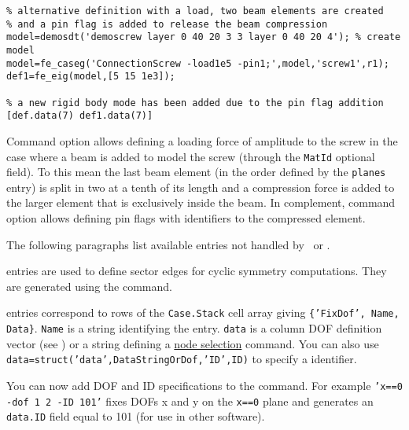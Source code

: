 \begin{SDT}
\begin{verbatim}
% alternative definition with a load, two beam elements are created
% and a pin flag is added to release the beam compression
model=demosdt('demoscrew layer 0 40 20 3 3 layer 0 40 20 4'); % create model
model=fe_caseg('ConnectionScrew -load1e5 -pin1;',model,'screw1',r1);
def1=fe_eig(model,[5 15 1e3]);

% a new rigid body mode has been added due to the pin flag addition
[def.data(7) def1.data(7)]
\end{verbatim}%

\vs

Command option  allows defining a loading force of amplitude  to the screw in the case where a beam is added to model the screw (through the {\tt MatId} optional field). To this mean the last beam element (in the order defined by the {\tt planes} entry) is split in two at a tenth of its length and a compression force is added to the larger element that is exclusively inside the beam. In complement, command option  allows defining pin flags with identifiers  to the compressed \beam element.


\end{SDT}


The following paragraphs list available entries not handled by \feload\ or \upcom.


\rz{} entries are used to define sector edges for cyclic symmetry computations. They are generated using the  command.


 entries correspond to rows of the {\tt Case.Stack} cell array giving {\tt \{'FixDof', Name, Data\}}. {\tt Name} is a string identifying the entry. {\tt data} is a column DOF definition vector (see ) or a string defining a \hyperlink{findnode}{node selection} command. You can also use \\{\tt data=struct('data',DataStringOrDof,'ID',ID)} to specify a identifier.

You can now add DOF and ID specifications to the  command. For example {\tt 'x==0 -dof 1 2 -ID 101'} fixes DOFs x and y on the {\tt x==0} plane and generates an {\tt data.ID} field equal to 101 (for use in other software).

